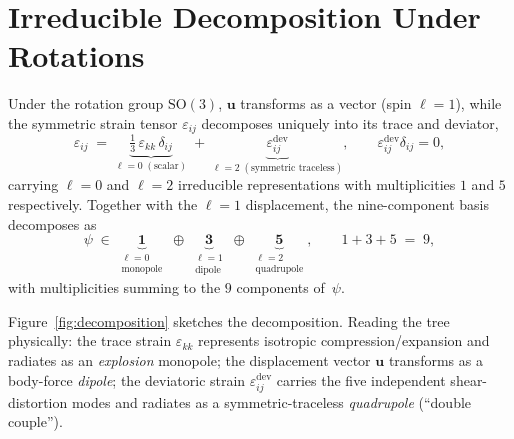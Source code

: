 \documentclass[11pt,a4paper]{article}
\newcommand{\eps}{\varepsilon}
\newcommand{\uu}{\bm{u}}
\newcommand{\dev}{\mathrm{dev}}
\theoremstyle{plain}
\theoremstyle{definition}
\theoremstyle{remark}
\begin{document}
\section{Irreducible Decomposition Under Rotations}\label{sec:irrep}
Under the rotation group $\mathrm{SO}(3)$, $\uu$ transforms as a vector
(spin $\ell=1$), while the symmetric strain tensor $\eps_{ij}$
decomposes uniquely into its trace and deviator,
\begin{equation}
  \eps_{ij}
  \;=\;
  \underbrace{\tfrac{1}{3}\,\eps_{kk}\,\delta_{ij}}_{\ell=0\;(\text{scalar})}
  \;+\;
  \underbrace{\eps_{ij}^{\dev}}_{\ell=2\;(\text{symmetric traceless})},
  \qquad
  \eps_{ij}^{\dev}\delta_{ij}=0,
  \label{eq:strain-split}
\end{equation}
carrying $\ell=0$ and $\ell=2$ irreducible representations with
multiplicities $1$ and $5$ respectively.  Together with the $\ell=1$
displacement, the nine-component basis decomposes as
\begin{equation}
  \psi \;\in\;
  \underbrace{\mathbf{1}}_{\substack{\ell=0\\ \text{monopole}}}
  \;\oplus\;
  \underbrace{\mathbf{3}}_{\substack{\ell=1\\ \text{dipole}}}
  \;\oplus\;
  \underbrace{\mathbf{5}}_{\substack{\ell=2\\ \text{quadrupole}}},
  \qquad
  1 + 3 + 5 \;=\; 9,
  \label{eq:irrep-sum}
\end{equation}
with multiplicities summing to the $9$ components of~$\psi$.

Figure~\ref{fig:decomposition} sketches the decomposition.  Reading the
tree physically: the trace strain $\eps_{kk}$ represents isotropic
compression/expansion and radiates as an \emph{explosion} monopole; the
displacement vector $\uu$ transforms as a body-force \emph{dipole}; the
deviatoric strain $\eps_{ij}^{\dev}$ carries the five independent
shear-distortion modes and radiates as a symmetric-traceless
\emph{quadrupole} (``double couple'').
\end{document}
